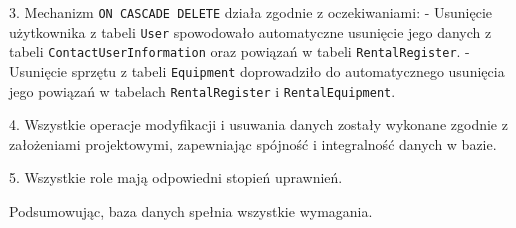 \documentclass{article}
\begin{document}
3. Mechanizm \texttt{ON CASCADE DELETE} działa zgodnie z oczekiwaniami:
   - Usunięcie użytkownika z tabeli \texttt{User} spowodowało automatyczne usunięcie jego danych z tabeli \texttt{ContactUserInformation} oraz powiązań w tabeli \texttt{RentalRegister}.
   - Usunięcie sprzętu z tabeli \texttt{Equipment} doprowadziło do automatycznego usunięcia jego powiązań w tabelach \texttt{RentalRegister} i \texttt{RentalEquipment}.

4. Wszystkie operacje modyfikacji i usuwania danych zostały wykonane zgodnie z założeniami projektowymi, zapewniając spójność i integralność danych w bazie.

5. Wszystkie role mają odpowiedni stopień uprawnień.


Podsumowując, baza danych spełnia wszystkie wymagania.
\end{document}
